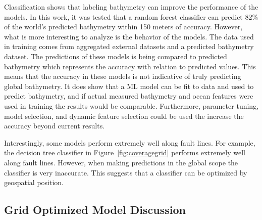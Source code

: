 \par
Classification shows that labeling bathymetry can improve the performance of the models.
In this work, it was tested that a random forest classifier can predict 82\% of the world's predicted bathymetry within 150 meters of accuracy. 
However, what is more interesting to analyze is the behavior of the models.
The data used in training comes from aggregated external datasets and a predicted bathymetry dataset.
The predictions of these models is being compared to predicted bathymetry which represents the accuracy with relation to predicted values.
This means that the accuracy in these models is not indicative of truly predicting global bathymetry.
It does show that a \ac{ML} model can be fit to data and used to predict bathymetry, and if actual measured bathymetry and ocean features were used in training the results would be comparable.
Furthermore, parameter tuning, model selection, and dynamic feature selection could be used the increase the accuracy beyond current results.

\par
Interestingly, some models perform extremely well along fault lines.
For example, the decision tree classifier in Figure~\ref{fig:coveragegrid} performs extremely well along fault lines.
However, when making predictions in the global scope the classifier is very inaccurate.
This suggests that a classifier can be optimized by geospatial position.



\subsection{Grid Optimized Model Discussion}


